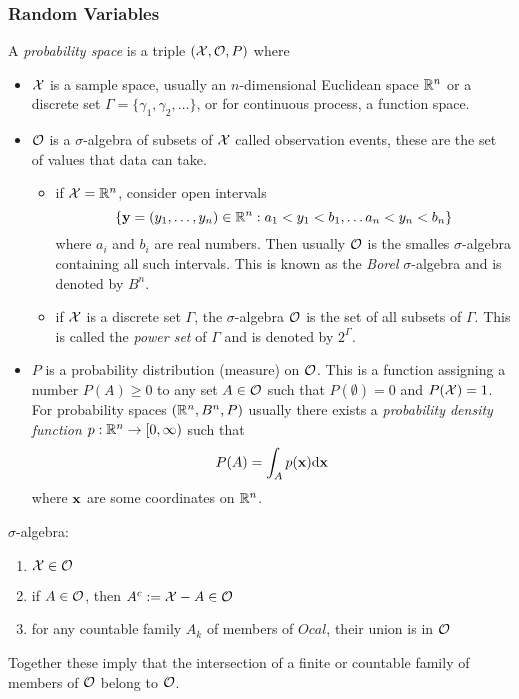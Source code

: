 \subsubsection{Random Variables}
A \textit{probability space} is a triple $(\mathcal{X}, \mathcal{O}, P)$ where
\begin{itemize}
\item $\mathcal{X}$ is a sample space, usually an $n$-dimensional Euclidean space $\mathbb{R}^n$ or a discrete set $\Gamma=\{\gamma_1,\gamma_2, \ldots\}$, or for continuous process, a function space.
\item $\mathcal{O}$ is a $\sigma$-algebra of subsets of $\mathcal{X}$ called observation events, these are the set of values that data can take. 
\begin{itemize}
\item if $\mathcal{X}=\mathbb{R}^n$, consider open intervals 
\begin{equation}
\label{eq:openInts}
\{ {\mathbf{y}} = (y_1,\ldots, y_n)\in \mathbb{R}^n : a_1 < y_1 < b_1, \ldots a_n < y_n < b_n \}
\end{equation}
where $a_i$ and $b_i$ are real numbers. Then usually $\mathcal{O}$ is the smalles $\sigma$-algebra containing all such intervals. This is known as the \textit{Borel} $\sigma$-algebra and is denoted by $B^n$.
\item if $\mathcal{X}$ is a discrete set $\Gamma$, the $\sigma$-algebra $\mathcal{O}$ is the set of all subsets of $\Gamma$. This is called the \textit{power set} of $\Gamma$ and is denoted by $2^{\Gamma}$.
\end{itemize}
\item $P$ is a probability distribution (measure) on $\mathcal{O}$. This is a function assigning a number $P(A)\geq 0$ to any set $A\in \mathcal{O}$ such that $P(\emptyset)=0$ and $P(\mathcal{X})=1$. For probability spaces $(\mathbb{R}^n, B^n, P)$ usually there exists a \textit{probability density function} $p: \mathbb{R}^n \rightarrow [0,\infty) $ such that 
\begin{equation}
P(A)=\int_A p(\mathbf{x}) {\mbox{d}} \mathbf{x}
\end{equation}
where $\mathbf{x}$ are some coordinates on $\mathbb{R}^n$. 
\end{itemize}

$\sigma$-algebra:
\begin{enumerate}
\item $\mathcal{X} \in \mathcal{O}$
\item if $A \in \mathcal{O}$, then $A^c := \mathcal{X} - A \in \mathcal{O}$
\item for any countable family $A_k$ of members of $Ocal$, their union is in $\mathcal{O}$
\end{enumerate}
Together these imply that the intersection of a finite or countable family of members of $\mathcal{O}$ belong to $\mathcal{O}$.

